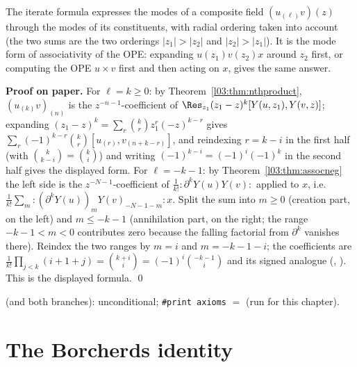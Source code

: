 \begin{physics}
The iterate formula expresses the modes of a composite field $(u_{(\ell)}v)(z)$ through the modes of
its constituents, with radial ordering taken into account (the two sums are the two orderings
$|z_1|>|z_2|$ and $|z_2|>|z_1|$). It is the mode form of associativity of the OPE: expanding
$u(z_1)v(z_2)x$ around $z_2$ first, or computing the OPE $u\times v$ first and then acting on $x$, gives
the same answer.
\end{physics}

\textbf{Proof on paper.} For $\ell = k\ge0$: by Theorem~\ref{l03:thm:nthproduct},
$(u_{(k)}v)_{(n)}$ is the $z^{-n-1}$-coefficient of $\Res_{z_1}(z_1-z)^k[Y(u,z_1),Y(v,z)]$; expanding
$(z_1-z)^k = \sum_r\binom kr z_1^r(-z)^{k-r}$ gives $\sum_r(-1)^{k-r}\binom kr[u_{(r)},v_{(n+k-r)}]$, and
reindexing $r = k-i$ in the first half (with $\binom k{k-i} = \binom ki$) and writing
$(-1)^{k-i} = (-1)^i(-1)^k$ in the second half gives the displayed form. For $\ell = -k-1$: by Theorem~\ref{l03:thm:assocneg} the left side
is the $z^{-N-1}$-coefficient of $\frac1{k!}{:}\partial^kY(u)Y(v){:}$ applied to $x$, i.e.\
$\frac1{k!}\sum_m{:}(\partial^kY(u))_mY(v)_{-N-1-m}{:}x$. Split the sum into $m\ge0$ (creation part,
on the left) and $m\le-k-1$ (annihilation part, on the right; the range $-k-1<m<0$ contributes zero
because the falling factorial from $\partial^k$ vanishes there). Reindex the two ranges by $m = i$ and
$m = -k-1-i$; the coefficients are $\frac1{k!}\prod_{j<k}(i+1+j) = \binom{k+i}{i} = (-1)^i\binom{-k-1}{i}$
and its signed analogue (\lean{posfac_eq}, \lean{negfac_eq}). This is the displayed formula. \qed

\begin{status}
 (and both branches): unconditional; \texttt{\#print axioms}  $=$  (run for
this chapter).
\end{status}

\section{The Borcherds identity}\label{l03:sec:borcherds}

